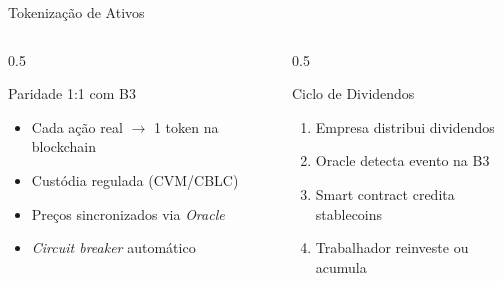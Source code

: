 \documentclass{libs/ufc_format}
\begin{document}
\begin{frame}{Tokenização de Ativos}
    \begin{columns}
        \begin{column}{0.5\textwidth}
            \begin{block}{Paridade 1:1 com B3}
                \begin{itemize}
                    \item Cada ação real $\to$ 1 token na blockchain
                    \item Custódia regulada (CVM/CBLC)
                    \item Preços sincronizados via \textit{Oracle}
                    \item \textit{Circuit breaker} automático
                \end{itemize}
            \end{block}
        \end{column}
        \begin{column}{0.5\textwidth}
            \begin{exampleblock}{Ciclo de Dividendos}
                \begin{enumerate}
                    \item Empresa distribui dividendos
                    \item Oracle detecta evento na B3
                    \item Smart contract credita stablecoins
                    \item Trabalhador reinveste ou acumula
                \end{enumerate}
            \end{exampleblock}
        \end{column}
    \end{columns}

    \vspace{0.3cm}

\end{frame}
\end{document}
